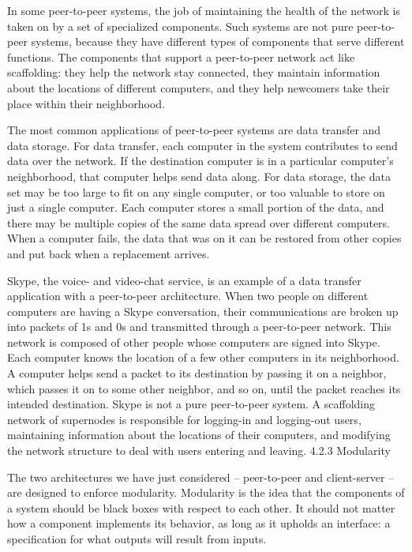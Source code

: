 \documentclass[letterpaper,10pt,dvipdfmx]{sphinxmanual}
\begin{document}
In some peer-to-peer systems, the job of maintaining the health of the network is taken on by a set of specialized components. Such systems are not pure peer-to-peer systems, because they have different types of components that serve different functions. The components that support a peer-to-peer network act like scaffolding: they help the network stay connected, they maintain information about the locations of different computers, and they help newcomers take their place within their neighborhood.

The most common applications of peer-to-peer systems are data transfer and data storage. For data transfer, each computer in the system contributes to send data over the network. If the destination computer is in a particular computer's neighborhood, that computer helps send data along. For data storage, the data set may be too large to fit on any single computer, or too valuable to store on just a single computer. Each computer stores a small portion of the data, and there may be multiple copies of the same data spread over different computers. When a computer fails, the data that was on it can be restored from other copies and put back when a replacement arrives.

Skype, the voice- and video-chat service, is an example of a data transfer application with a peer-to-peer architecture. When two people on different computers are having a Skype conversation, their communications are broken up into packets of 1s and 0s and transmitted through a peer-to-peer network. This network is composed of other people whose computers are signed into Skype. Each computer knows the location of a few other computers in its neighborhood. A computer helps send a packet to its destination by passing it on a neighbor, which passes it on to some other neighbor, and so on, until the packet reaches its intended destination. Skype is not a pure peer-to-peer system. A scaffolding network of supernodes is responsible for logging-in and logging-out users, maintaining information about the locations of their computers, and modifying the network structure to deal with users entering and leaving.
4.2.3   Modularity

The two architectures we have just considered -- peer-to-peer and client-server -- are designed to enforce modularity. Modularity is the idea that the components of a system should be black boxes with respect to each other. It should not matter how a component implements its behavior, as long as it upholds an interface: a specification for what outputs will result from inputs.
\end{document}
